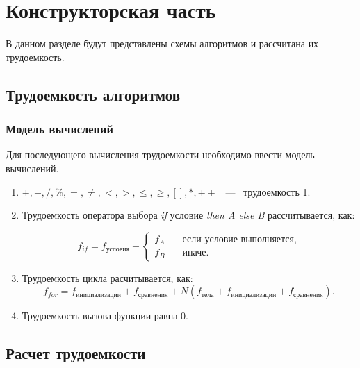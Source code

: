 \documentclass[14pt,russian]{scrartcl}
\begin{document}
\section{Конструкторская часть}

В данном разделе будут представлены схемы алгоритмов и рассчитана их трудоемкость.

\subsection{Трудоемкость алгоритмов}

\subsubsection{Модель вычислений}

Для последующего вычисления трудоемкости необходимо ввести модель вычислений.

\begin{enumerate}
    \item $+, -, /, \%, =, \neq, <, >, \leq, \geq, [ ], *, ++$ ~---~ трудоемкость 1.
    \item Трудоемкость оператора выбора \textit{if} условие \textit{then A else B} рассчитывается, как: 
    
    \begin{equation}
        f_{if} = f_{\text{условия}} + \begin{cases}
                                f_A & \quad \text{если условие выполняется,} \\
                                f_B & \quad \text{иначе}.
                                \end{cases}
    \end{equation}

    \item Трудоемкость цикла расчитывается, как:
    \begin{equation}
        f_{for} = f_{\text{инициализации}} + f_{\text{сравнения}} + N(f_{\text{тела}} + f_{\text{инициализации}} + f_{\text{сравнения}}).
    \end{equation}

    \item Трудоемкость вызова функции равна 0.
\end{enumerate}

\subsection{Расчет трудоемкости}
\end{document}
